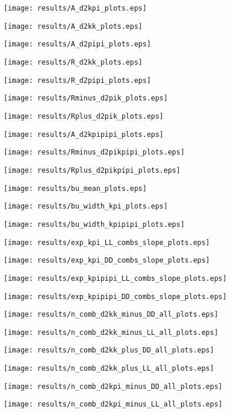 \documentclass[11pt,a4paper]{article}
\begin{document}
\texttt{[image: results/A\_d2kpi\_plots.eps]}

\texttt{[image: results/A\_d2kk\_plots.eps]}

\texttt{[image: results/A\_d2pipi\_plots.eps]}

\texttt{[image: results/R\_d2kk\_plots.eps]}

\texttt{[image: results/R\_d2pipi\_plots.eps]}

\texttt{[image: results/Rminus\_d2pik\_plots.eps]}

\texttt{[image: results/Rplus\_d2pik\_plots.eps]}

\texttt{[image: results/A\_d2kpipipi\_plots.eps]}

\texttt{[image: results/Rminus\_d2pikpipi\_plots.eps]}

\texttt{[image: results/Rplus\_d2pikpipi\_plots.eps]}

\texttt{[image: results/bu\_mean\_plots.eps]}

\texttt{[image: results/bu\_width\_kpi\_plots.eps]}

\texttt{[image: results/bu\_width\_kpipipi\_plots.eps]}

\texttt{[image: results/exp\_kpi\_LL\_combs\_slope\_plots.eps]}

\texttt{[image: results/exp\_kpi\_DD\_combs\_slope\_plots.eps]}

\texttt{[image: results/exp\_kpipipi\_LL\_combs\_slope\_plots.eps]}

\texttt{[image: results/exp\_kpipipi\_DD\_combs\_slope\_plots.eps]}

\iffalse
\texttt{[image: results/n\_comb\_d2kk\_minus\_DD\_all\_plots.eps]}

\texttt{[image: results/n\_comb\_d2kk\_minus\_LL\_all\_plots.eps]}

\texttt{[image: results/n\_comb\_d2kk\_plus\_DD\_all\_plots.eps]}

\texttt{[image: results/n\_comb\_d2kk\_plus\_LL\_all\_plots.eps]}

\texttt{[image: results/n\_comb\_d2kpi\_minus\_DD\_all\_plots.eps]}

\texttt{[image: results/n\_comb\_d2kpi\_minus\_LL\_all\_plots.eps]}
\end{document}

